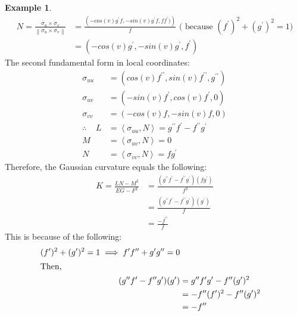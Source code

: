 \documentclass{article}
\theoremstyle{plain}
\theoremstyle{definition}
\newtheorem{example}{Example}
\theoremstyle{remark}
\begin{document}
\begin{example}
    \begin{align*}
        N = \frac{\sigma_u \times \sigma_v }{\left\lVert \sigma_u \times \sigma_v \right\rVert } & =  \frac{\left( -cos(v)g^{\prime}f, -sin(v)g^{\prime}f, ff^{\prime} )\right)}{f} \text{  (  because  \((f^{\prime})^2 + (g^{\prime})^2  = 1  ) \)} \\ 
        & = \left( -cos(v)g^{\prime}, -sin(v)g^{\prime}, f^{\prime} \right)
    \end{align*}
    The second fundamental form in local coordinates:
    \begin{align*}
        \sigma_{uu} & = (cos(v)f^{\prime \prime}, sin(v)f^{\prime \prime}, g^{\prime \prime}) \\
        \sigma_{uv} & = (-sin(v)f^{\prime}, cos(v)f^{\prime}, 0) \\
        \sigma_{vv} & = (-cos(v)f, -sin(v)f, 0 ) \\
        \therefore \; \; \; \; L & = \left\langle \sigma_{uu}, N \right\rangle = g^{\prime \prime}f^{\prime} -  f^{\prime \prime} g^{\prime}\\
        M & = \left\langle \sigma_{uv} , N \right\rangle = 0 \\
        N & = \left\langle \sigma_{vv} , N \right\rangle = fg^{\prime} 
    \end{align*}
    Therefore, the Gaussian curvature equals the following:
    \begin{align*}
        K = \frac{LN-M^2}{EG-F^2}  & = \frac{(g^{\prime \prime}f^{\prime} -  f^{\prime \prime} g^{\prime})(fg^{\prime} ) }{ f^2} \\
         & =  \frac{(g^{\prime \prime}f^{\prime} -  f^{\prime \prime} g^{\prime})(g^{\prime} ) }{ f} \\
         & = \frac{-f^{\prime \prime}}{f}
    \end{align*}
     This is because of the following:
     \begin{align*}
        (f^{\prime})^2 + (g^{\prime})^2  = 1  \implies f^{\prime}f^{\prime \prime} + g^{\prime}g^{\prime \prime}  = 0 \\
        \shortintertext{Then, }
        (g^{\prime \prime}f^{\prime} -  f^{\prime \prime} g^{\prime})(g^{\prime} ) & = g^{\prime \prime}f^{\prime}g^{\prime}  -  f^{\prime \prime} (g^{\prime})^2 \\
        & =  -f^{\prime \prime}(f^{\prime})^2  -  f^{\prime \prime} (g^{\prime})^2 \\
        & = -f^{\prime \prime}
     \end{align*}
\end{example}
\end{document}
